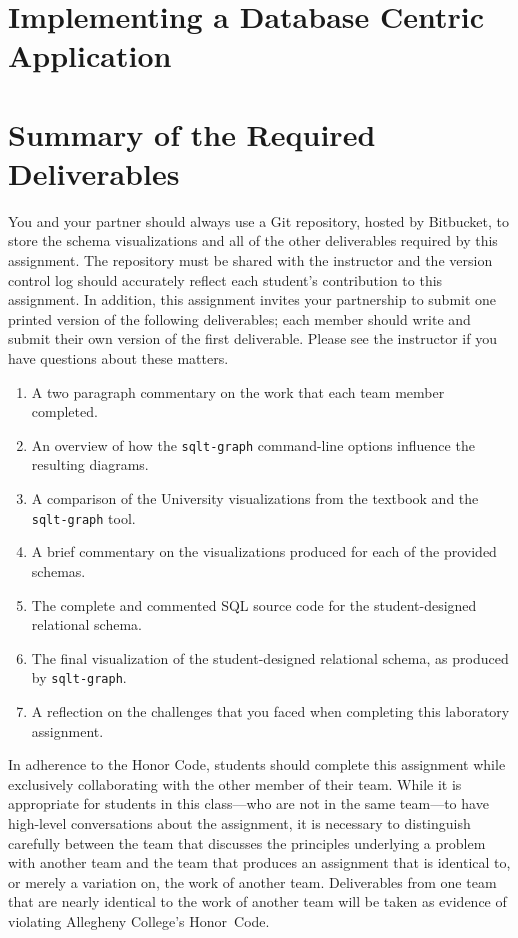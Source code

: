 \section*{Implementing a Database Centric Application}



\section*{Summary of the Required Deliverables}

You and your partner should always use a Git repository, hosted by Bitbucket, to store the schema visualizations and
all of the other deliverables required by this assignment. The repository must be shared with the instructor and
the version control log should accurately reflect each student's contribution to this assignment. In addition, this
assignment invites your partnership to submit one printed version of the following deliverables; each member should
write and submit their own version of the first deliverable. Please see the instructor if you have questions about
these matters.


\begin{enumerate}
  \setlength{\itemsep}{0pt}
  \item A two paragraph commentary on the work that each team member completed. 
  \item An overview of how the {\tt sqlt-graph} command-line options influence the resulting diagrams.
  \item A comparison of the University visualizations from the textbook and the {\tt sqlt-graph} tool.
  \item A brief commentary on the visualizations produced for each of the provided schemas.
  \item The complete and commented SQL source code for the student-designed relational schema.
  \item The final visualization of the student-designed relational schema, as produced by {\tt sqlt-graph}.
  \item A reflection on the challenges that you faced when completing this laboratory assignment.
\end{enumerate}


In adherence to the Honor Code, students should complete this assignment while exclusively collaborating with the
other member of their team. While it is appropriate for students in this class---who are not in the same team---to have
high-level conversations about the assignment, it is necessary to distinguish carefully between the team that discusses
the principles underlying a problem with another team and the team that produces an assignment that is identical to, or
merely a variation on, the work of another team.  Deliverables from one team that are nearly identical to the work of
another team will be taken as evidence of violating Allegheny College's \mbox{Honor Code}.




